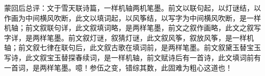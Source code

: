 \begin{parag}

    \begin{note}蒙回后总评：文于雪天联诗篇，一样机轴两机笔墨。前文以联句起，以灯谜结，以作画为中间横风吹断，此文以填词起，以风筝结，以写字为中间横风吹断，是一样机轴；前文叙联句详，此文叙填词略，是两样笔墨，前文之叙作画略，此文之叙写字详，是两样笔墨。前文叙灯谜，叙猜灯谜，此文叙风筝，叙放风筝，是一样机轴；前文叙七律在联句后，此文叙古歌在填词前，是两样笔墨。前文叙黛玉替宝玉写诗，此文叙宝玉替探春续词，是一样机轴，前文赋诗后有一首诗，此文填词前有一首词，是两样笔墨。噫！参伍之变，错综其数，此固难为粗心这道也！\end{note}
\end{parag}
